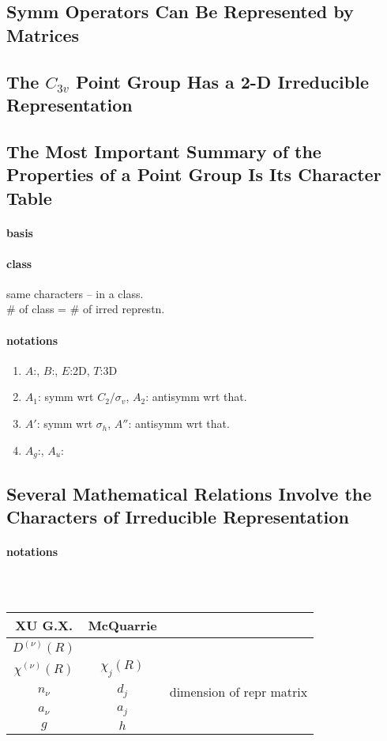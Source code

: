 \documentclass[a4paper]{article}
\numberwithin{equation}{section}
\begin{document}
\subsection{Symm Operators Can Be Represented by Matrices}

\subsection{The $ C_{3v} $ Point Group Has a 2-D Irreducible Representation}

\subsection{The Most Important Summary of the Properties of a Point Group Is Its Character Table}

\paragraph{basis}

\paragraph{class}
same characters -- in a class.\\
\# of class = \# of irred represtn.
\paragraph{notations}
\begin{enumerate}
	\item $ A $:, $ B $:, $ E $:2D, $ T $:3D
	\item $ A_1 $: symm wrt $ C_2/\sigma_v $, $ A_2 $: antisymm wrt that.
	\item $ A' $: symm wrt $ \sigma_h $, $ A'' $: antisymm wrt that.
	\item $ A_g $:, $ A_u $:
\end{enumerate}

\subsection{Several Mathematical Relations Involve the Characters of Irreducible Representation}
\paragraph{notations}~\\
\begin{table}[H]
	\centering
	\begin{tabular}{ccc}
		\hline
		XU G.X. & McQuarrie &  \\ \hline
		$ D^{(\nu)}(R) $ &  & \\
		$ \chi^{(\nu)}(R) $ & $ \chi_j(R) $ &\\
		$ n_\nu $ & $ d_j $ & dimension of repr matrix \\
		$ a_\nu $ & $ a_j $ &\\
		$ g $ & $ h $ &\\
		\hline
	\end{tabular}
	\caption{}
\end{table}
\end{document}
